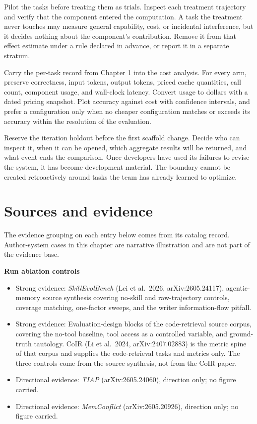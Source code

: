 Pilot the tasks before treating them as trials. Inspect each treatment trajectory and verify that the component entered the computation. A task the treatment never touches may measure general capability, cost, or incidental interference, but it decides nothing about the component's contribution. Remove it from that effect estimate under a rule declared in advance, or report it in a separate stratum.

Carry the per-task record from Chapter 1 into the cost analysis. For every arm, preserve correctness, input tokens, output tokens, priced cache quantities, call count, component usage, and wall-clock latency. Convert usage to dollars with a dated pricing snapshot. Plot accuracy against cost with confidence intervals, and prefer a configuration only when no cheaper configuration matches or exceeds its accuracy within the resolution of the evaluation.

Reserve the iteration holdout before the first scaffold change. Decide who can inspect it, when it can be opened, which aggregate results will be returned, and what event ends the comparison. Once developers have used its failures to revise the system, it has become development material. The boundary cannot be created retroactively around tasks the team has already learned to optimize.

\section*{Sources and evidence}

The evidence grouping on each entry below comes from its catalog record. Author-system cases in this chapter are narrative illustration and are not part of the evidence base.

\textbf{Run ablation controls}

\begin{itemize}
\tightlist
\item
  Strong evidence: \emph{SkillEvolBench} (Lei et al.~2026, arXiv:2605.24117), agentic-memory source synthesis covering no-skill and raw-trajectory controls, coverage matching, one-factor sweeps, and the writer information-flow pitfall.
\item
  Strong evidence: Evaluation-design blocks of the code-retrieval source corpus, covering the no-tool baseline, tool access as a controlled variable, and ground-truth tautology. CoIR (Li et al.~2024, arXiv:2407.02883) is the metric spine of that corpus and supplies the code-retrieval tasks and metrics only. The three controls come from the source synthesis, not from the CoIR paper.
\item
  Directional evidence: \emph{TIAP} (arXiv:2605.24060), direction only; no figure carried.
\item
  Directional evidence: \emph{MemConflict} (arXiv:2605.20926), direction only; no figure carried.
\end{itemize}

